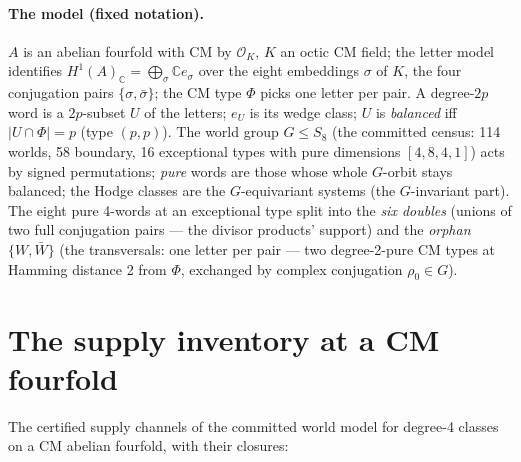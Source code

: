 \documentclass[11pt]{article}
\begin{document}
\paragraph{The model (fixed notation).}  $A$ is an abelian fourfold with CM by
$\mathcal{O}_K$, $K$ an octic CM field; the letter model identifies $H^1(A)_\mathbb{C} =
\bigoplus_{\sigma} \mathbb{C}e_\sigma$ over the eight embeddings $\sigma$ of $K$, the four
conjugation pairs $\{\sigma,\bar\sigma\}$; the CM type $\Phi$ picks one letter per pair.  A
degree-$2p$ word is a $2p$-subset $U$ of the letters; $e_U$ is its wedge class;
$U$ is \emph{balanced} iff $|U\cap\Phi| = p$ (type $(p,p)$).  The world group
$G \leq S_8$ (the committed census: 114 worlds, 58 boundary, 16 exceptional types with pure
dimensions $[4,8,4,1]$) acts by signed permutations; \emph{pure} words are those whose whole
$G$-orbit stays balanced; the Hodge classes are the $G$-equivariant systems
(the $G$-invariant part).  The eight pure 4-words at an exceptional type split into the
\emph{six doubles} (unions of two full conjugation pairs --- the divisor products' support)
and the \emph{orphan} $\{W,\bar W\}$ (the transversals: one letter per pair --- two
degree-2-pure CM types at Hamming distance 2 from $\Phi$, exchanged by complex conjugation
$\rho_0 \in G$).

\section{The supply inventory at a CM fourfold}

The certified supply channels of the committed world model for degree-4 classes on a CM
abelian fourfold, with their closures:
\end{document}
